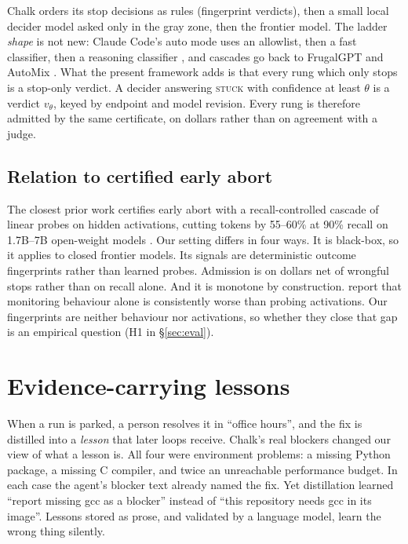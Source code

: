 \documentclass[11pt]{article}
\theoremstyle{remark}
\begin{document}
Chalk orders its stop decisions as rules (fingerprint verdicts), then a small local decider model asked only in the gray zone, then the frontier model. The ladder \emph{shape} is not new: Claude Code's auto mode uses an allowlist, then a fast classifier, then a reasoning classifier \citep{anthropic2026automode}, and cascades go back to FrugalGPT and AutoMix \citep{chen2023frugalgpt,madaan2023automix}. What the present framework adds is that every rung which only stops is a stop-only verdict. A decider answering \textup{\textsc{stuck}} with confidence at least $\theta$ is a verdict $v_\theta$, keyed by endpoint and model revision. Every rung is therefore admitted by the same certificate, on dollars rather than on agreement with a judge.

\subsection{Relation to certified early abort}

The closest prior work certifies early abort with a recall-controlled cascade of linear probes on hidden activations, cutting tokens by 55--60\% at 90\% recall on 1.7B--7B open-weight models \citep{ruan2026doomed}. Our setting differs in four ways. It is black-box, so it applies to closed frontier models. Its signals are deterministic outcome fingerprints rather than learned probes. Admission is on dollars net of wrongful stops rather than on recall alone. And it is monotone by construction. \citet{ruan2026doomed} report that monitoring behaviour alone is consistently worse than probing activations. Our fingerprints are neither behaviour nor activations, so whether they close that gap is an empirical question (H1 in \S\ref{sec:eval}).

\section{Evidence-carrying lessons}
\label{sec:lessons}

When a run is parked, a person resolves it in ``office hours'', and the fix is distilled into a \emph{lesson} that later loops receive. Chalk's real blockers changed our view of what a lesson is. All four were environment problems: a missing Python package, a missing C compiler, and twice an unreachable performance budget. In each case the agent's blocker text already named the fix. Yet distillation learned ``report missing gcc as a blocker'' instead of ``this repository needs gcc in its image''. Lessons stored as prose, and validated by a language model, learn the wrong thing silently.
\end{document}
